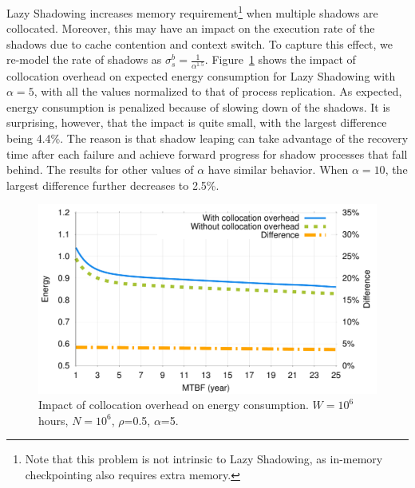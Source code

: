 
Lazy Shadowing increases memory requirement\footnote{Note that this problem is not intrinsic to Lazy Shadowing, as in-memory checkpointing also requires extra memory.} when multiple shadows are collocated. Moreover, this may have an impact on the execution rate of the shadows due to cache contention and context switch. 
To capture this effect,  
we re-model the rate of shadows as $\sigma_s^b=\frac{1}{\alpha^{1.5}}$.
Figure~\ref{fig:comp_vary_fail_speed} shows the impact of collocation overhead on expected energy consumption for Lazy Shadowing with $\alpha=5$, with all the values normalized to that of process replication. %
As expected, energy consumption is penalized because
of slowing down of the shadows. It is surprising, however, that the impact is quite small, with the largest difference being 4.4\%. The reason is that shadow leaping can take advantage of the recovery time after each failure and achieve forward progress for shadow processes that fall behind. 
The results for other values of $\alpha$ have similar behavior. 
When $\alpha=10$, the largest difference further decreases to 2.5\%. 


\begin{figure}[t]
	\captionsetup{justification=centering}
	\begin{center}
		\includegraphics[width=0.7\columnwidth]{Figures/collocation.pdf}
	\end{center}
	\caption{Impact of collocation overhead on energy consumption. $W=10^6$ hours, $N=10^6$, $\rho$=0.5, $\alpha$=5.}
	\label{fig:comp_vary_fail_speed}
\end{figure}

